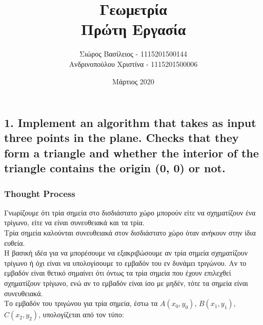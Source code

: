 \documentclass[12pt]{article}
\title{\hugeΥπολογιστική Γεωμετρία\\Πρώτη Εργασία}
\author{Σιώρος Βασίλειος - 1115201500144\\Ανδρινοπούλου Χριστίνα - 1115201500006}
\date{Μάρτιος 2020}
\begin{document}
\maketitle


\pagebreak


\subsection*{1. Implement an algorithm that takes as input three points in the plane. Checks
that they form a triangle and whether the interior of the triangle contains the origin (0, 0) or
not.}

\subsubsection*{Thought Process}

Γνωρίζουμε ότι τρία σημεία στο δισδιάστατο χώρο μπορούν είτε να σχηματίζουν ένα τρίγωνο, είτε να είναι συνευθειακά και τα τρία. \\

 Τρία σημεία καλούνται συνευθειακά στον δισδιάστατο χώρο όταν ανήκουν στην ίδια ευθεία. \\

 Η βασική ιδέα για να μπορέσουμε να εξακριβώσουμε αν τρία σημεία σχηματίζουν τρίγωνο ή όχι είναι να υπολογίσουμε το εμβαδόν του εν δυνάμει τριγώνου. Αν το εμβαδόν είναι θετικό σημαίνει ότι όντως τα τρία σημεία που έχουν επιλεχθεί σχηματίζουν τρίγωνο, ενώ αν το εμβαδόν είναι ίσο με μηδέν, τότε τα σημεία είναι συνευθειακά. \\

Το εμβαδόν του τριγώνου για τρία σημεία, έστω τα \(A(x_0, y_0)\), \(B(x_1, y_1)\), \(C(x_2, y_2)\), υπολογίζεται από τον τύπο:
\end{document}

